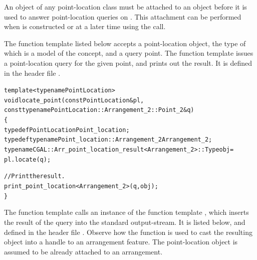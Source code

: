 An object  of any point-location class must be attached to an
 object  before it is used to answer
point-location queries on . This attachment can be performed
when  is constructed or at a later time using the
 call.

The function template listed below accepts a point-location object,
the type of which is a model of the 
concept, and a query point. The function template issues a
point-location query for the given point, and prints out the result.
It is defined in the header file .

\label{lst:pl}
\begin{alltt}
template <typename PointLocation>
void locate_point(const PointLocation& pl,
                  const typename PointLocation::Arrangement_2::Point_2& q)
\{
  typedef PointLocation                                 Point_location;
  typedef typename Point_location::Arrangement_2        Arrangement_2;
  typename CGAL::Arr_point_location_result<Arrangement_2>::Type obj =
    pl.locate(q);

  // Print the result.
  print_point_location<Arrangement_2>(q, obj);
  \}
\end{alltt}

The function template  calls an instance of the
function template , which inserts the
result of the query into the standard output-stream. It is listed
below, and defined in the header file .
Observe how the function  is used to cast the
resulting object into a handle to an arrangement feature. The
point-location object  is assumed to be already attached
to an arrangement.


